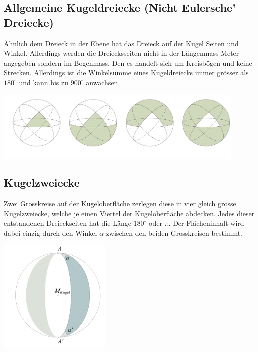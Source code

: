 \begin{refsection}
\subsection{Allgemeine Kugeldreiecke (Nicht Eulersche’ Dreiecke)}
Ähnlich dem Dreieck in der Ebene hat das Dreieck auf der Kugel Seiten und Winkel. Allerdings werden die Dreiecksseiten nicht in der Längenmass Meter angegeben sondern im Bogenmass. Den es handelt sich um Kreisbögen und keine Strecken.
Allerdings ist die Winkelsumme eines Kugeldreiecks immer grösser als $180^{\circ}$ und kann bis zu $900^{\circ}$ anwachsen.

\begin{center}
        \includegraphics[width=0.9\textwidth]{kugel/_Dreiecksarten.jpg}
\end{center}


\subsection{Kugelzweiecke} 
Zwei Grosskreise auf der Kugeloberfläche zerlegen diese in vier gleich grosse Kugelzweiecke, welche je einen Viertel der Kugeloberfläche abdecken. 
Jedes dieser entstandenen Dreieckseiten hat die Länge
$180^{\circ}$ oder $\pi$.
Der Flächeninhalt wird dabei einzig durch den Winkel $\alpha$ zwischen den beiden Grosskreisen bestimmt.

\begin{center}
        \includegraphics[width=0.4\textwidth]{kugel/_Zweieck.jpg}
\end{center}


\end{refsection}
